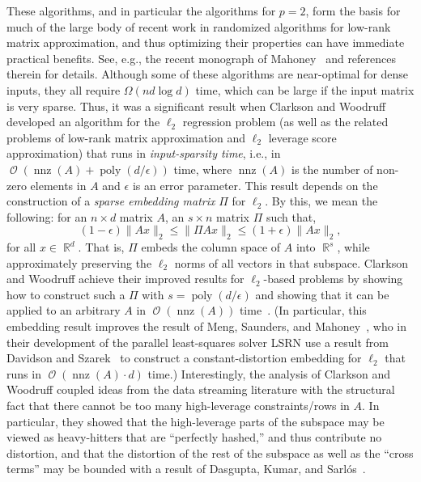 \documentclass[11pt]{article}
\DeclareMathOperator{\poly}{poly}
\DeclareMathOperator{\bigO}{\mathcal{O}}
\DeclareMathOperator{\nnz}{nnz}
\DeclareMathOperator{\R}{\mathbb{R}}
\begin{document}
These algorithms, and in particular the algorithms for $p=2$, form the basis for
much of the large body of recent work in randomized algorithms for low-rank
matrix approximation, and thus optimizing their properties can have immediate
practical benefits.
See, e.g., the recent monograph of Mahoney~\cite{Mah-mat-rev_BOOK} and
references therein for details.
Although some of these algorithms are near-optimal for dense inputs, they all
require $\Omega(nd \log d)$ time, which can be large if the input matrix is 
very sparse.
Thus, it was a significant result when Clarkson and
Woodruff~\cite{CW12sparse_TR} developed an algorithm for the $\ell_2$ regression
problem (as well as the related problems of low-rank matrix approximation and
$\ell_2$ leverage score approximation) that runs in \emph{input-sparsity time},
i.e., in $\bigO(\nnz(A) + \poly(d/\epsilon))$ time, where $\nnz(A)$ is the
number of non-zero elements in $A$ and $\epsilon$ is an error parameter.
This result depends on the construction of a \emph{sparse embedding matrix}
$\Pi$ for $\ell_2$.
By this,
we mean the following: 
for an $n \times d$ matrix $A$, an $s \times n$ matrix $\Pi$ such that, 
$$
(1-\epsilon)\|Ax\|_2 \le \|\Pi A x\|_2 \le (1+\epsilon)\|Ax\|_2 , 
$$
for all $x\in\R^{d}$.
That is, $\Pi$ embeds the column space of $A$ into $\R^{s}$, while approximately
preserving the $\ell_2$ norms of all vectors in that subspace.
Clarkson and Woodruff achieve their improved results for $\ell_2$-based problems
by showing how to construct such a $\Pi$ with $s=\poly(d/\epsilon)$ and showing
that it can be applied to an arbitrary $A$ in $\bigO(\nnz(A))$
time~\cite{CW12sparse_TR}.
(In particular, this embedding result improves the result of Meng, Saunders, and
Mahoney~\cite{MSM11_TR}, who in their development of the parallel least-squares
solver \textsc{LSRN} use a result from Davidson and
Szarek~\cite{davidson2001local} to construct a constant-distortion embedding for
$\ell_2$ that runs in $\bigO(\nnz(A) \cdot d)$ time.)
Interestingly, the analysis of Clarkson and Woodruff coupled ideas from the data
streaming literature with the structural fact that there cannot be too many
high-leverage constraints/rows in $A$.
In particular, they showed that the high-leverage parts of the subspace may be
viewed as heavy-hitters that are ``perfectly hashed,'' and thus contribute no
distortion, and that the distortion of the rest of the subspace as well as the
``cross terms'' may be bounded with a result of Dasgupta, Kumar, and
Sarl\'{o}s~\cite{DKT10}.
\end{document}
